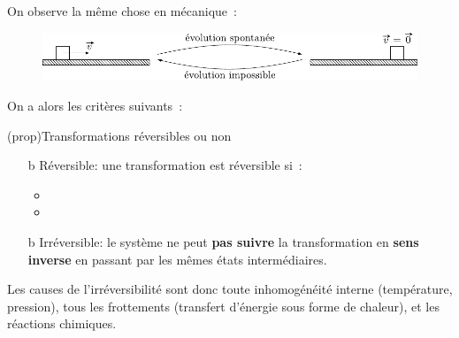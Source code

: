 \documentclass[../../main/main.tex]{subfiles}
\begin{document}
On observe la même chose en mécanique~:

\begin{figure}[htbp]
	\centering
	\includegraphics[scale=1]{evol_vits}
\end{figure}

On a alors les critères suivants~:
\begin{tcb*}(prop){Transformations réversibles ou non}
	\begin{itemize}
		\item[b]{Réversible}: une transformation est réversible si~:
		\begin{itemize}
			\item {}
			\item {}
		\end{itemize}
		\item[b]{Irréversible}: le système ne peut \textbf{pas suivre} la
		transformation en \textbf{sens inverse} en passant par les mêmes états
		intermédiaires.
	\end{itemize}
	Les causes de l'irréversibilité sont donc toute inhomogénéité interne
	(température, pression), tous les frottements (transfert d'énergie sous forme
	de chaleur), et les réactions chimiques.
\end{tcb*}
\end{document}
